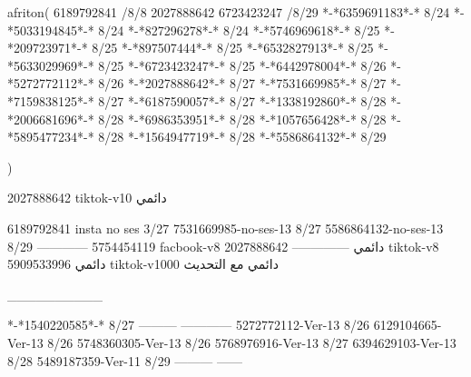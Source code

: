 afriton(
6189792841 /8/8
2027888642
6723423247 /8/29
*-*6359691183*-* 8/24
*-*5033194845*-* 8/24
*-*827296278*-* 8/24
*-*5746969618*-* 8/25
*-*209723971*-* 8/25
*-*897507444*-* 8/25
*-*6532827913*-* 8/25
*-*5633029969*-* 8/25
*-*6723423247*-* 8/25
*-*6442978004*-* 8/26
*-*5272772112*-* 8/26
*-*2027888642*-* 8/27
*-*7531669985*-* 8/27
*-*7159838125*-* 8/27
*-*6187590057*-* 8/27
*-*1338192860*-* 8/28
*-*2006681696*-* 8/28
*-*6986353951*-* 8/28
*-*1057656428*-* 8/28
*-*5895477234*-* 8/28
*-*1564947719*-* 8/28
*-*5586864132*-* 8/29

)

2027888642 tiktok-v10
دائمي

6189792841 insta no ses
3/27
7531669985-no-ses-13
8/27
5586864132-no-ses-13
8/29
------------
5754454119 facbook-v8
دائمي
--------------
2027888642 tiktok-v8
دائمي
5909533996 tiktok-v1000
دائمي مع التحديث

__________

*-*1540220585*-* 8/27
---------
------------
5272772112-Ver-13
8/26
6129104665-Ver-13
8/26
5748360305-Ver-13
8/26
5768976916-Ver-13
8/27
6394629103-Ver-13
8/28
5489187359-Ver-11
8/29
---------
------
